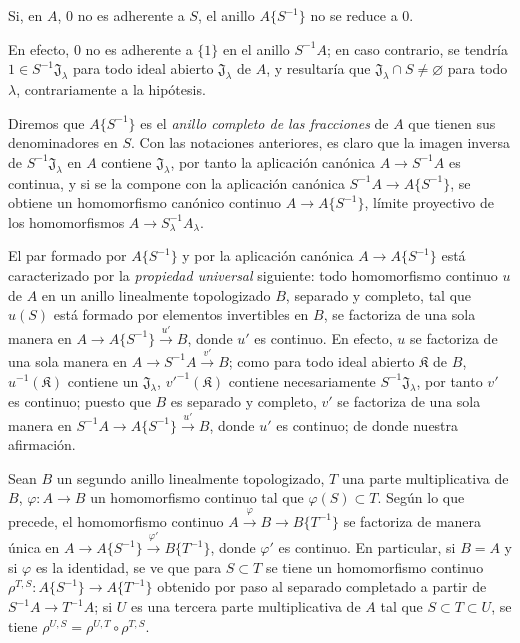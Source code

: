 
\begin{corollary}[7.6.4]
\label{0.7.6.4-fr}
Si, en $A$, $0$ no es adherente a $S$, el anillo $A\{S^{-1}\}$ no se
reduce a $0$.
\end{corollary}

En efecto, $0$ no es adherente a $\{1\}$ en el anillo $S^{-1}A$; en caso contrario,
se tendría $1\in S^{-1}\mathfrak J_\lambda$ para todo ideal abierto
$\mathfrak J_\lambda$ de $A$, y resultaría que
$\mathfrak J_\lambda\cap S\neq\varnothing$ para todo $\lambda$, contrariamente
a la hipótesis.

\begin{env}[7.6.5]
\label{0.7.6.5-fr}
Diremos que $A\{S^{-1}\}$ es el \emph{anillo completo de las fracciones} de $A$
que tienen sus denominadores en $S$. Con las notaciones anteriores, es claro
que la imagen inversa de $S^{-1}\mathfrak J_\lambda$ en $A$ contiene
$\mathfrak J_\lambda$, por tanto la aplicación canónica $A\to S^{-1}A$ es
continua, y si se la compone con la aplicación canónica
$S^{-1}A\to A\{S^{-1}\}$, se obtiene un homomorfismo canónico continuo
$A\to A\{S^{-1}\}$, límite proyectivo de los homomorfismos
$A\to S_\lambda^{-1}A_\lambda$.
\end{env}

\begin{env}[7.6.6]
\label{0.7.6.6-fr}
El par formado por $A\{S^{-1}\}$ y por la aplicación canónica
$A\to A\{S^{-1}\}$ está caracterizado por la \emph{propiedad universal}
siguiente: todo homomorfismo continuo $u$ de $A$ en un anillo linealmente
topologizado $B$, separado y completo, tal que $u(S)$ está formado por elementos
invertibles en $B$, se factoriza de una sola manera en
$A\to A\{S^{-1}\}\xrightarrow{u'}B$, donde $u'$ es continuo. En efecto, $u$ se
factoriza de una sola manera en $A\to S^{-1}A\xrightarrow{v'}B$; como para
todo ideal abierto $\mathfrak K$ de $B$, $u^{-1}(\mathfrak K)$ contiene un
$\mathfrak J_\lambda$, ${v'}^{-1}(\mathfrak K)$ contiene necesariamente
$S^{-1}\mathfrak J_\lambda$, por tanto $v'$ es continuo; puesto que $B$ es separado y
completo, $v'$ se factoriza de una sola manera en
$S^{-1}A\to A\{S^{-1}\}\xrightarrow{u'}B$, donde $u'$ es continuo; de donde nuestra
afirmación.
\end{env}

\begin{env}[7.6.7]
\label{0.7.6.7-fr}
Sean $B$ un segundo anillo linealmente topologizado, $T$ una parte
multiplicativa de $B$, $\varphi:A\to B$ un homomorfismo continuo tal que
$\varphi(S)\subset T$. Según lo que precede, el homomorfismo continuo
$A\xrightarrow{\varphi}B\to B\{T^{-1}\}$ se factoriza de manera única en
$A\to A\{S^{-1}\}\xrightarrow{\varphi'}B\{T^{-1}\}$, donde $\varphi'$ es
continuo. En particular, si $B=A$ y si $\varphi$ es la identidad, se ve que
para $S\subset T$ se tiene un homomorfismo continuo
$\rho^{T,S}:A\{S^{-1}\}\to A\{T^{-1}\}$ obtenido por paso al separado completado
a partir de $S^{-1}A\to T^{-1}A$; si $U$ es una tercera parte
multiplicativa de $A$ tal que $S\subset T\subset U$, se tiene
$\rho^{U,S}=\rho^{U,T}\circ\rho^{T,S}$.
\end{env}

